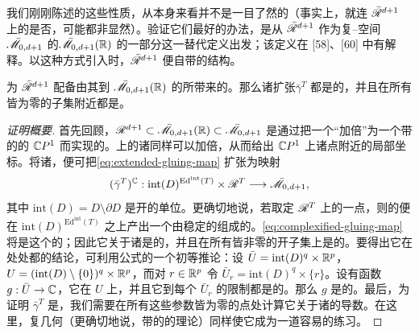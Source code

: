 我们刚刚陈述的这些性质，从\trGluingConstruction{}本身来看并不是一目了然的（事实上，就连 $\bar{\mathscr{R}}^{d+1}$ 上的\trTopology{}是否\trHausdorff，可能都非显然）。验证它们最好的办法，是从 $\bar{\mathscr{R}}^{d+1}$ 作为复\trDeligne--\trMumford{}空间 $\bar{\mathscr{M}}_{0,d+1}$ 的\trRealLocus{}$\bar{\mathscr{M}}_{0,d+1}(\mathbb{R})$ 的一部分这一替代定义出发；该定义在 [58]、[60] 中有解释。以这种方式引入时，$\bar{\mathscr{R}}^{d+1}$ 便自带\trSmooth\trCompact\trCorneredBoundary\trManifold{}的\trCanonical{}结构。
\begin{lemma}\label{thm:dm-smooth-structure}
为 $\bar{\mathscr{R}}^{d+1}$ 配备由其到 $\bar{\mathscr{M}}_{0,d+1}(\mathbb{R})$ 的\trEmbedding{}所带来的\trSmoothStructure。那么诸扩张\trGluingMap{}$\bar\gamma^T$ 都是\trSmooth{}的，并且在所有\trGluingParameter{}皆为零的子集附近都是\trLocalDiffeomorphism。
\end{lemma}
\begin{proof}[证明概要]
首先回顾，\trEmbedding{}$\mathscr{R}^{d+1}\subset\bar{\mathscr{M}}_{0,d+1}(\mathbb{R})\subset\bar{\mathscr{M}}_{0,d+1}$ 是通过把一个\trPointedDisc{}“加倍”为一个带\trAntiholomorphic{}\trInvolution{}的\trPunctured{}的 $\mathbb{C}P^1$ 而实现的。\trDisk{}上的诸\trStriplikeEnd{}同样可以加倍，从而给出 $\mathbb{C}P^1$ 上诸\trPunctured{}点附近的局部\trHolomorphic{}坐标。将诸\trGluingParameter{}\trComplexification，便可把\eqref{eq:extended-gluing-map} 扩张为映射
\begin{equation}\label{eq:complexified-gluing-map}
(\bar\gamma^T)^{\mathbb{C}}:\mathrm{int}(D)^{\mathrm{Ed}^{\mathrm{int}}(T)}\times\mathscr{R}^T\longrightarrow\bar{\mathscr{M}}_{0,d+1},
\end{equation}
其中 $\mathrm{int}(D)=D\setminus\partial D$ 是开的单位\trDisk。更确切地说，若取定 $\mathscr{R}^T$ 上的一点，则\trComplexification{}的\trGluingConstruction{}便在 $\mathrm{int}(D)^{\mathrm{Ed}^{\mathrm{int}}(T)}$ 之上产出一个由稳定的\trPointedDisc{}组成的\trHolomorphic\trFamily。\eqref{eq:complexified-gluing-map} 将是这个\trFamily{}的\trClassifyingMap；因此它关于诸\trGluingParameter{}是\trHolomorphic{}的，并且在所有\trGluingParameter{}皆非零的开子集上是\trSmooth{}的。要得出它在处处都\trSmooth{}的结论，可利用\trCauchy{}公式的一个初等推论：设 $\bar{U}=\mathrm{int}(D)^q\times\mathbb{R}^p$，$U=(\mathrm{int}(D)\setminus\{0\})^q\times\mathbb{R}^p$，而对 $r\in\mathbb{R}^p$ 令 $\bar{U}_r=\mathrm{int}(D)^q\times\{r\}$。设有函数 $g:\bar{U}\to\mathbb{C}$，它在 $U$ 上\trSmooth，并且它到每个 $\bar{U}_r$ 的限制都是\trHolomorphic{}的。那么 $g$ 是\trSmooth{}的。最后，为证明 $\bar\gamma^T$ 是\trLocalDiffeomorphism，我们需要在所有这些参数皆为零的点处计算它关于诸\trGluingParameter{}的导数。在这里，复几何（更确切地说，带\trNode{}的\trRiemann\trSurface{}的\trDeformation{}理论）同样使它成为一道容易的练习。
\end{proof}
